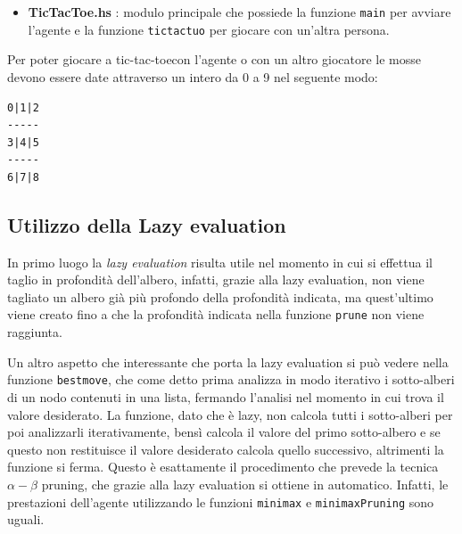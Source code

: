 \documentclass[11pt, a4paper]{article}
\newcommand{\tic}{tic-tac-toe}
\newcommand{\image}[4]{
	\begin{figure}[H]
		\centering
		\texttt{[image: \#2]}
		\caption{#3.}
		\label{#4}
	\end{figure}
}
\begin{document}
\begin{itemize}
\begin{itemize}
		\item \textbf{miniman} : versione dell'algoritmo che risulta essere una semplice traduzione dello pseudo-codice mostrato in Figura~\ref{minimax} e dunque restituisce per ogni nodo dell'albero il valore di utilità del suo sotto-albero;
		\item \textbf{minimaxPruning} : versione modificata della funzione \textit{minimax} che prevede l'utilizzo della tecnica dell'$\alpha-\beta$ pruning;
		\image{0.5}{minimax}{Pseudo-codice dell'algoritmo minimax}{minimax} 
	\end{itemize}
	entrambe queste funzioni vengono chiamate dalla funzione \texttt{bestmove} che ricevendo una lista di nodi col proprio valore di utilità e il \textit{Player} che deve muovere, scorre la lista finché non trova un valore di utilità pari al valore del \textit{Player} dato. La funzione \texttt{bestmove} si occupa anche di limitare la profondità dell'albero grazie alla funzione \textit{prune}, la quale data una profondità ed un albero, ``taglia" quest'ultimo alla profondità indicata;
	\item \textbf{TicTacToe.hs} : modulo principale che possiede la funzione \texttt{main} per avviare l'agente e la funzione \texttt{tictactuo} per giocare con un'altra persona.
\end{itemize}

Per poter giocare a \tic con l'agente o con un altro giocatore le mosse devono essere date attraverso un intero da 0 a 9 nel seguente modo:
\begin{lstlisting}
0|1|2
-----
3|4|5
-----
6|7|8
\end{lstlisting}

\subsection{Utilizzo della Lazy evaluation}
In primo luogo la \textit{lazy evaluation} risulta utile nel momento in cui si effettua il taglio in profondità dell'albero, infatti, grazie alla lazy evaluation, non viene tagliato un albero già più profondo della profondità indicata, ma quest'ultimo viene creato fino a che la profondità indicata nella funzione \texttt{prune} non viene raggiunta.

Un altro aspetto che interessante che porta la lazy evaluation si può vedere nella funzione \texttt{bestmove}, che come detto prima analizza in modo iterativo i sotto-alberi di un nodo contenuti in una lista, fermando l'analisi nel momento in cui trova il valore desiderato. La funzione, dato che è lazy, non calcola tutti i sotto-alberi per poi analizzarli iterativamente, bensì calcola il valore del primo sotto-albero e se questo non restituisce il valore desiderato calcola quello successivo, altrimenti la funzione si ferma. Questo è esattamente il procedimento che prevede la tecnica $\alpha-\beta$ pruning, che grazie alla lazy evaluation si ottiene in automatico. Infatti, le prestazioni dell'agente utilizzando le funzioni \texttt{minimax} e \texttt{minimaxPruning} sono uguali.
\end{document}
